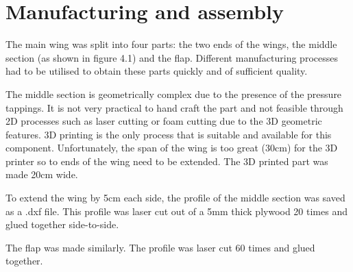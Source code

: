 \chapter{Manufacturing and assembly}

The main wing was split into four parts: the two ends of the wings, the middle section (as shown in figure 4.1) and the flap. Different manufacturing processes had to be utilised to obtain these parts quickly and of sufficient quality. 

\thispagestyle{fancy}
The middle section is geometrically complex due to the presence of the pressure tappings. It is not very practical to hand craft the part and not feasible through 2D processes such as laser cutting or foam cutting due to the 3D geometric features. 3D printing is the only process that is suitable and available for this component. Unfortunately, the span of the wing is too great (30cm) for the 3D printer so to ends of the wing need to be extended. The 3D printed part was made 20cm wide. 

To extend the wing by 5cm each side, the profile of the middle section was saved as a .dxf file. This profile was laser cut out of a 5mm thick plywood 20 times and glued together side-to-side. 

The flap was made similarly. The profile was laser cut 60 times and glued together. 

